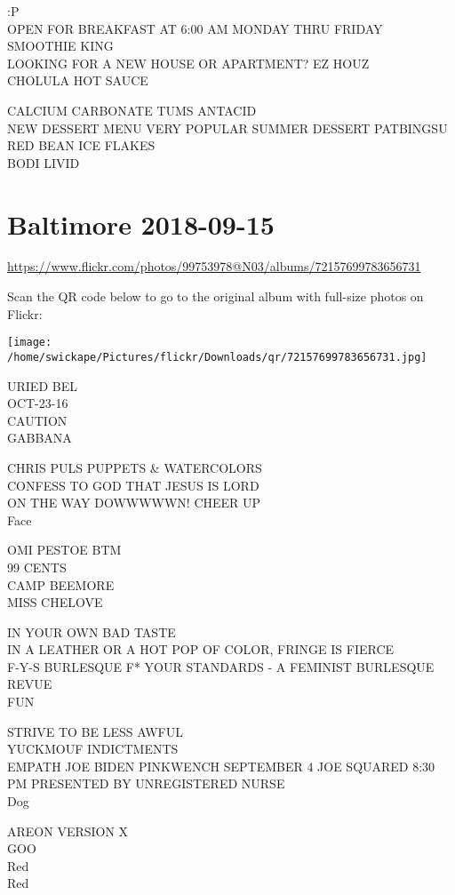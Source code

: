 \documentclass[10pt,letterpaper]{article}
\begin{document}
:P\\
OPEN FOR BREAKFAST AT 6:00 AM MONDAY THRU FRIDAY SMOOTHIE KING\\
LOOKING FOR A NEW HOUSE OR APARTMENT?  EZ HOUZ\\
CHOLULA HOT SAUCE

CALCIUM CARBONATE TUMS ANTACID\\
NEW DESSERT MENU VERY POPULAR SUMMER DESSERT PATBINGSU RED BEAN ICE FLAKES\\
BODI LIVID


\section*{Baltimore 2018-09-15}

\url{https://www.flickr.com/photos/99753978@N03/albums/72157699783656731}

Scan the QR code below to go to the original album with full-size photos on Flickr:

\texttt{[image: /home/swickape/Pictures/flickr/Downloads/qr/72157699783656731.jpg]}


URIED BEL\\
OCT{-}23{-}16\\
CAUTION\\
GABBANA

CHRIS PULS PUPPETS \& WATERCOLORS\\
CONFESS TO GOD THAT JESUS IS LORD\\
ON THE WAY DOWWWWWN!  CHEER UP\\
Face

OMI PESTOE BTM\\
99 CENTS\\
CAMP BEEMORE\\
MISS CHELOVE

IN YOUR OWN BAD TASTE\\
IN A LEATHER OR A HOT POP OF COLOR, FRINGE IS FIERCE\\
F{-}Y{-}S BURLESQUE F* YOUR STANDARDS {-} A FEMINIST BURLESQUE REVUE\\
FUN

STRIVE TO BE LESS AWFUL\\
YUCKMOUF INDICTMENTS\\
EMPATH JOE BIDEN PINKWENCH SEPTEMBER 4 JOE SQUARED 8:30 PM PRESENTED BY UNREGISTERED NURSE\\
Dog

AREON VERSION X\\
GOO\\
Red\\
Red
\end{document}
